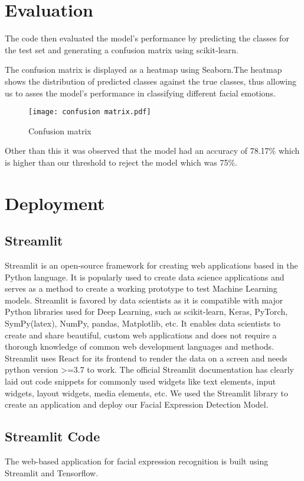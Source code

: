 \documentclass[11pt]{article}
\begin{document}
\section{Evaluation}

The code then evaluated the model's performance by predicting the classes for the test set and generating a confusion matrix using scikit-learn. 

The confusion matrix is displayed as a heatmap using Seaborn.The heatmap shows the distribution of predicted classes against the true classes, thus allowing us to asses the model’s performance in classifying different facial emotions. 

\begin{figure}[H]
    \centering
    \texttt{[image: confusion matrix.pdf]}
    \caption{Confusion matrix}
    \label{fig:enter-label}
\end{figure}

\noindent Other than this it was observed that the model had an accuracy of 78.17\% which is higher than our threshold to reject the model which was 75\%.
\section{Deployment}
\subsection{Streamlit}
Streamlit is an open-source framework for creating web applications based in the
Python language. It is popularly used to create data science applications and
serves as a method to create a working prototype to test Machine Learning
models. Streamlit is favored by data scientists as it is compatible with major
Python libraries used for Deep Learning, such as scikit-learn, Keras, PyTorch,
SymPy(latex), NumPy, pandas, Matplotlib, etc. It enables data scientists to create
and share beautiful, custom web applications and does not require a thorough
knowledge of common web development languages and methods. Streamlit uses
React for its frontend to render the data on a screen and needs python version
>=3.7 to work.
The official Streamlit documentation has clearly laid out code snippets for
commonly used widgets like text elements, input widgets, layout widgets, media
elements, etc. We used the Streamlit library to create an application and deploy our Facial Expression Detection Model.

\subsection{Streamlit Code}
The web-based application for facial expression recognition is built using Streamlit and Tensorflow. \\ \\
\end{document}
